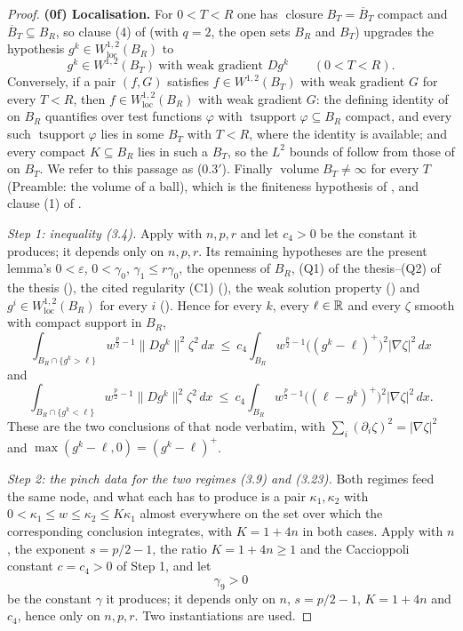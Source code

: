 \begin{proof}
\textbf{(0f) Localisation.}  For $0<T<R$ one has
$\operatorname{closure}B_T=\overline B_T$ compact and $\overline B_T\subseteq
B_R$, so clause (4) of  (with $q=2$, the open sets
$B_R$ and $B_T$) upgrades the hypothesis
$g^k\in W^{1,2}_{\mathrm{loc}}(B_R)$ to
\[
g^k\in W^{1,2}(B_T)\ \text{with weak gradient }Dg^k
\qquad(0<T<R).
\tag{0.3}
\]
Conversely, if a pair $(f,G)$ satisfies $f\in W^{1,2}(B_T)$ with weak gradient
$G$ for every $T<R$, then $f\in W^{1,2}_{\mathrm{loc}}(B_R)$ with weak gradient
$G$: the defining identity of  on $B_R$ quantifies
over test functions $\varphi$ with $\operatorname{tsupport}\varphi\subseteq B_R$
compact, and every such $\operatorname{tsupport}\varphi$ lies in some $B_T$ with
$T<R$, where the identity is available; and every compact $K\subseteq B_R$ lies
in such a $B_T$, so the $L^2$ bounds of  follow from those
of  on $B_T$.  We refer to this passage as (0.3$'$).  Finally
$\operatorname{volume}B_T\ne\infty$ for every $T$ (Preamble: the volume of a
ball), which is the finiteness hypothesis of
,  and clause (1)
of .

\emph{Step 1: inequality \textup{(3.4)}.}  Apply
 with $n,p,r$ and let $c_4>0$ be the constant it
produces; it depends only on $n,p,r$.  Its remaining hypotheses are the present
lemma's $0<\varepsilon$, $0<\gamma_0$, $\gamma_1\le r\gamma_0$, the openness of
$B_R$, (Q1) of the thesis--(Q2) of the thesis (), the cited
regularity (C1) (), the weak solution property
() and
$g^i\in W^{1,2}_{\mathrm{loc}}(B_R)$ for every $i$
().  Hence for every $k$, every $\ell\in\mathbb{R}$ and every
$\zeta$ smooth with compact support in $B_R$,
\[
\int_{B_R\cap\{g^k>\ell\}}w^{\frac p2-1}\|Dg^k\|^2\zeta^2\,dx
\ \le\ c_4\int_{B_R}w^{\frac p2-1}\bigl((g^k-\ell)^+\bigr)^2|\nabla\zeta|^2\,dx
\tag{3.4$^+$}
\]
and
\[
\int_{B_R\cap\{g^k<\ell\}}w^{\frac p2-1}\|Dg^k\|^2\zeta^2\,dx
\ \le\ c_4\int_{B_R}w^{\frac p2-1}\bigl((\ell-g^k)^+\bigr)^2|\nabla\zeta|^2\,dx .
\tag{3.4$^-$}
\]
These are the two conclusions of that node verbatim, with
$\sum_i(\partial_i\zeta)^2=|\nabla\zeta|^2$ and
$\max(g^k-\ell,0)=(g^k-\ell)^+$.

\emph{Step 2: the pinch data for the two regimes \textup{(3.9)} and
\textup{(3.23)}.}  Both regimes feed the same node, and what each has to produce
is a pair $\kappa_1,\kappa_2$ with $0<\kappa_1\le w\le\kappa_2\le K\kappa_1$
almost everywhere on the set over which the corresponding conclusion integrates,
with $K=1+4n$ in both cases.  Apply  with
$n$, the exponent $s=p/2-1$, the ratio $K=1+4n\ge1$ and the Caccioppoli constant
$c=c_4>0$ of Step 1, and let
\[
\gamma_9>0
\]
be the constant $\gamma$ it produces; it depends only on $n$, $s=p/2-1$,
$K=1+4n$ and $c_4$, hence only on $n,p,r$.  Two instantiations are used.


\end{proof}
